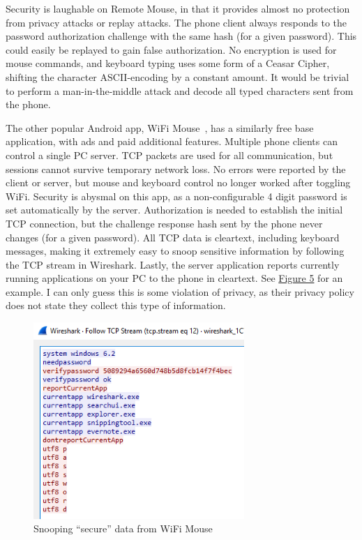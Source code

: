 \documentclass{sig-alternate}
\renewcommand\_{\textunderscore\allowbreak}  %
\begin{document}
Security is laughable on Remote Mouse, in that it provides almost no protection from privacy attacks or replay attacks. The phone client always responds to the password authorization challenge with the same hash (for a given password). This could easily be replayed to gain false authorization. No encryption is used for mouse commands, and keyboard typing uses some form of a Ceasar Cipher, shifting the character ASCII-encoding by a constant amount. It would be trivial to perform a man-in-the-middle attack and decode all typed characters sent from the phone.

The other popular Android app, WiFi Mouse~\cite{wifimouse}, has a similarly free base application, with ads and paid additional features. Multiple phone clients can control a single PC server. TCP packets are used for all communication, but sessions cannot survive temporary network loss. No errors were reported by the client or server, but mouse and keyboard control no longer worked after toggling WiFi. Security is abysmal on this app, as a non-configurable 4 digit password is set automatically by the server. Authorization is needed to establish the initial TCP connection, but the challenge response hash sent by the phone never changes (for a given password). All TCP data is cleartext, including keyboard messages, making it extremely easy to snoop sensitive information by following the TCP stream in Wireshark. Lastly, the server application reports currently running applications on your PC to the phone in cleartext. See \hyperlink{fig:snoop}{Figure 5} for an example. I can only guess this is some violation of privacy, as their privacy policy does not state they collect this type of information.

\begin{figure}
	\centering
	\hypertarget{fig:snoop}{}
	\includegraphics[width=8cm]{screenshots/snoop.png}
	\caption{Snooping ``secure'' data from WiFi Mouse}
\end{figure}
\end{document}
